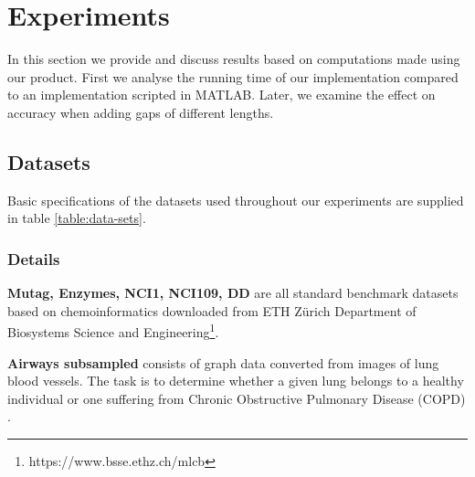 \documentclass{article}
\begin{document}
\section{Experiments}
In this section we provide and discuss results based on computations made using our product. First we analyse the running time of our implementation compared to an implementation scripted in MATLAB. Later, we examine the effect on accuracy when adding gaps of different lengths.

\subsection{Datasets}
Basic specifications of the datasets used throughout our experiments are supplied in table \ref{table:data-sets}.

\begin{table}[H]
		\centering
		\hspace*{-0.7in}
	\caption{\textit{Dataset specifications}}
	\label{table:data-sets}
\end{table}

\subsubsection{Details}
\textbf{Mutag, Enzymes, NCI1, NCI109, DD} are all standard benchmark datasets based on chemoinformatics downloaded from ETH Zürich Department of Biosystems Science and Engineering\footnote{https://www.bsse.ethz.ch/mlcb}.

\textbf{Airways subsampled} consists of graph data converted from images of lung blood vessels. The task is to determine whether a given lung belongs to a healthy individual or one suffering from Chronic Obstructive Pulmonary Disease (COPD) \cite{graphhopper}.
\end{document}
